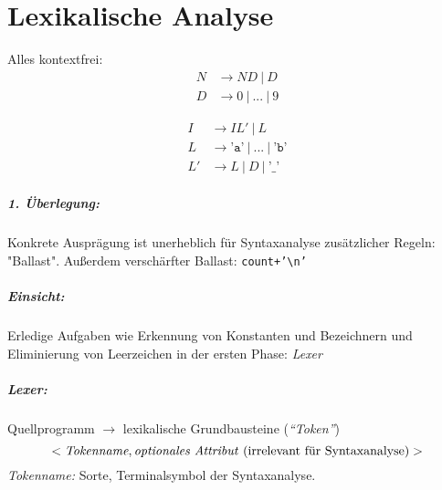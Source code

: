 \chapter{Lexikalische Analyse}
Alles kontextfrei:
\begin{align*}
 N &\to ND\ |\ D \tag{für natürliche Zahlen}\\
 D &\to 0\ |\ ...\ |\ 9
\end{align*}

\begin{align*}
 I &\to IL'\ |\ L \tag{für Bezeichner}\\
 L &\to \texttt{'a'}\ |\ ...\ |\ \texttt{'b'}\\
 L' &\to L\ |\ D\ |\ \texttt{'\_'}
\end{align*}

\paragraph{1. Überlegung:} Konkrete Ausprägung ist unerheblich für Syntaxanalyse zusätzlicher Regeln: "Ballast". Außerdem verschärfter Ballast: \texttt{\dq\textvisiblespace\textvisiblespace  count\textvisiblespace +'\textbackslash n'\dq}
\paragraph{Einsicht:} Erledige Aufgaben wie Erkennung von Konstanten und Bezeichnern und Eliminierung von Leerzeichen in der ersten Phase: \emph{Lexer}
\paragraph{Lexer:} Quellprogramm $\to$ lexikalische Grundbausteine (\emph{"`Token"'})
\[<\textit{Tokenname},\text{\textit{optionales Attribut} (irrelevant für Syntaxanalyse)}>\]
\emph{Tokenname:} Sorte, Terminalsymbol der Syntaxanalyse.
